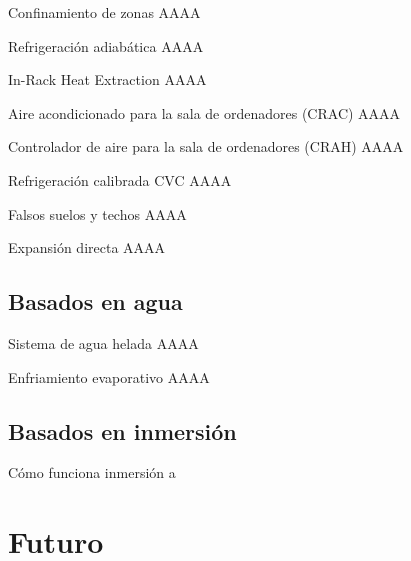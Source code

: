 \documentclass[aspectratio=169, compress]{beamer}
\begin{document}
\begin{frame}{Confinamiento de zonas}
    AAAA
\end{frame}

\begin{frame}{Refrigeración adiabática}
    AAAA
\end{frame}

\begin{frame}{In-Rack Heat Extraction}
    AAAA
\end{frame}

\begin{frame}{Aire acondicionado para la sala de ordenadores (CRAC)}
    AAAA
\end{frame}

\begin{frame}{Controlador de aire para la sala de ordenadores (CRAH)}
    AAAA
\end{frame}

\begin{frame}{Refrigeración calibrada CVC}
    AAAA
\end{frame}

\begin{frame}{Falsos suelos y techos}
    AAAA
\end{frame}

\begin{frame}{Expansión directa}
    AAAA
\end{frame}



\subsection{Basados en agua}

\begin{frame}{Sistema de agua helada}
    AAAA
\end{frame}

\begin{frame}{Enfriamiento evaporativo}
    AAAA
\end{frame}



\subsection{Basados en inmersión}

\begin{frame}{Cómo funciona inmersión}
    a
\end{frame}

\section{Futuro}
\end{document}
